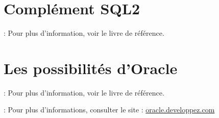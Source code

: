 \documentclass[10pt]{beamer}
\begin{document}
\section{Complément SQL2}
\begin{frame}{\secname : \subsecname}
    Pour plus d'information, voir le livre de référence.
\end{frame}

\section{Les possibilités d'Oracle}
\begin{frame}{\secname : \subsecname}
    Pour plus d'information, voir le livre de référence.
\end{frame}

\begin{frame}{\secname : \subsecname}
    Pour plus d'informations, consulter le site :
    \href{http://oracle.developpez.com/guide/administration/adminrole/}{oracle.developpez.com}
\end{frame}
\end{document}
